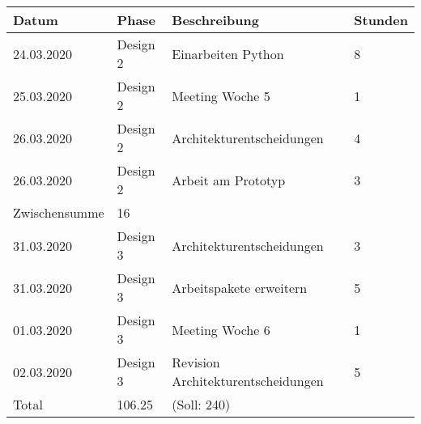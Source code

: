 \documentclass[
	ngerman,
	toc=listof, %
	toc=bibliography, %
	footnotes=multiple, %
	parskip=half, %
	numbers=noendperiod %
]{scrartcl}
\begin{document}
	\newpage

	\begin{tabularx}{\textwidth}{llXl}
		\toprule
		Datum & Phase & Beschreibung & Stunden \\
		\midrule
		24.03.2020 & Design 2 & Einarbeiten Python & 8 \\
		25.03.2020 & Design 2 & Meeting Woche 5 & 1 \\
		26.03.2020 & Design 2 & Architekturentscheidungen & 4 \\
		26.03.2020 & Design 2 & Arbeit am Prototyp & 3 \\
		\midrule
		Zwischensumme & 16 & & \\
		\midrule
		31.03.2020 & Design 3 & Architekturentscheidungen & 3 \\
		31.03.2020 & Design 3 & Arbeitspakete erweitern &  5 \\
		01.03.2020 & Design 3 & Meeting Woche 6 & 1 \\
		02.03.2020 & Design 3 & Revision Architekturentscheidungen & 5 \\
		\midrule
		Total & 106.25 & (Soll: 240) & \\
		\bottomrule
	\end{tabularx}
\end{document}
